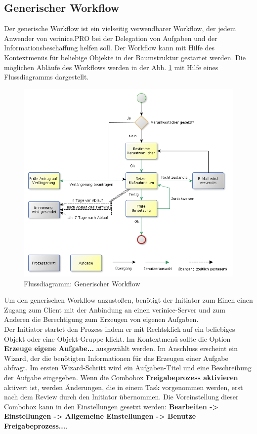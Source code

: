 \documentclass[a4paper,10pt]{book}
\begin{document}
\subsection{Generischer Workflow}
Der generische Workflow ist ein vielseitig verwendbarer Workflow, der jedem Anwender von verinice.\textsc{PRO} bei der Delegation von Aufgaben und der
Informationsbeschaffung helfen soll. Der Workflow kann mit Hilfe des Kontextmenüs für beliebige Objekte in der Baumstruktur gestartet werden.
Die möglichen Abläufe des Workflows werden in der Abb. \ref{Flussdiagramm: Generischer Workflow} mit Hilfe eines Flussdiagramms dargestellt.
\begin{figure}[htb!]
  \centering
  \includegraphics[scale=.50]{Screenshot/Generic-workflow.png}
  \caption{\label{Flussdiagramm: Generischer Workflow} Flussdiagramm: Generischer Workflow}
\end{figure}
Um den generischen Workflow anzustoßen, benötigt der Initiator zum Einen einen Zugang zum Client mit der Anbindung an einen verinice-Server und zum Anderen
die Berechtigung zum Erzeugen von eigenen Aufgaben.\\

Der Initiator startet den Prozess indem er mit Rechtsklick auf ein beliebiges Objekt oder eine Objekt-Gruppe klickt. Im Kontextmenü sollte die Option
\textbf{Erzeuge eigene Aufgabe...} ausgewählt werden. Im Anschluss erscheint ein Wizard, der die benötigten Informationen für das Erzeugen einer Aufgabe
abfragt. Im ersten Wizard-Schritt wird ein Aufgaben-Titel und eine Beschreibung der Aufgabe eingegeben. Wenn die Combobox \textbf{Freigabeprozess aktivieren} aktivert ist, werden Änderungen, die in einem Task vorgenommen werden, erst nach dem Review durch den Initiator übernommen. Die Voreinstellung dieser Combobox kann in den Einstellungen gesetzt werden: \textbf{Bearbeiten -> Einstellungen -> Allgemeine Einstellungen -> Benutze Freigabeprozess...}.
\end{document}
